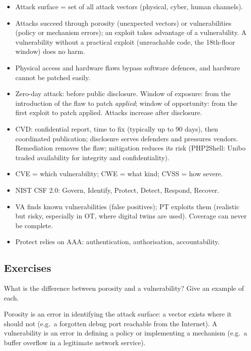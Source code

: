 \begin{summary}
\begin{itemize}
    \item Attack surface = set of all attack vectors (physical, cyber, human channels).
    \item Attacks succeed through porosity (unexpected vectors) or vulnerabilities (policy or mechanism errors); an exploit takes advantage of a vulnerability. A vulnerability without a practical exploit (unreachable code, the 18th-floor window) does no harm.
    \item Physical access and hardware flaws bypass software defences, and hardware cannot be patched easily.
    \item Zero-day attack: before public disclosure. Window of exposure: from the introduction of the flaw to patch \emph{applied}; window of opportunity: from the first exploit to patch applied. Attacks increase after disclosure.
    \item CVD: confidential report, time to fix (typically up to 90 days), then coordinated publication; disclosure serves defenders and pressures vendors. Remediation removes the flaw; mitigation reduces its risk (PHP2Shell: Unibo traded availability for integrity and confidentiality).
    \item CVE = which vulnerability; CWE = what kind; CVSS = how severe.
    \item NIST CSF 2.0: Govern, Identify, Protect, Detect, Respond, Recover.
    \item VA finds known vulnerabilities (false positives); PT exploits them (realistic but risky, especially in OT, where digital twins are used). Coverage can never be complete.
    \item Protect relies on AAA: authentication, authorisation, accountability.
\end{itemize}
\end{summary}

\subsection*{Exercises}

\begin{exercise}
What is the difference between porosity and a vulnerability? Give an example of each.
\end{exercise}
\begin{solution}
Porosity is an error in identifying the attack surface: a vector exists where it should not (e.g.\ a forgotten debug port reachable from the Internet). A vulnerability is an error in defining a policy or implementing a mechanism (e.g.\ a buffer overflow in a legitimate network service).
\end{solution}

